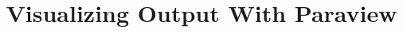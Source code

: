 \documentclass{report}
\begin{document}
\title{Visualizing Output With Paraview}
\maketitle{}


\end{document}

